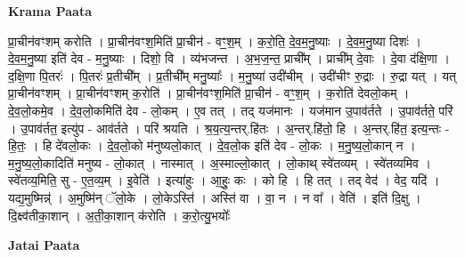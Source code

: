 \documentclass[17pt]{extarticle}
\begin{document}
\textbf{Krama Paata} \newline

प्रा॒चीन॑वꣳशम् करोति । प्रा॒चीन॑वꣳश॒मिति॑ प्रा॒चीन॑ - वꣳ॒॒श॒म् । क॒रो॒ति॒ दे॒व॒म॒नु॒ष्याः । दे॒व॒म॒नु॒ष्या दिशः॑ । दे॒व॒म॒नु॒ष्या इति॑ देव - म॒नु॒ष्याः । दिशो॒ वि । व्य॑भजन्त । अ॒भ॒ज॒न्त॒ प्राची᳚म् । प्राची᳚म् दे॒वाः । दे॒वा द॑क्षि॒णा । द॒क्षि॒णा पि॒तरः॑ । पि॒तरः॑ प्र॒तीची᳚म् । प्र॒तीची᳚म् मनु॒ष्याः᳚ । म॒नु॒ष्या॑ उदी॑चीम् । उदी॑चीꣳ रु॒द्राः । रु॒द्रा यत् । यत् प्रा॒चीन॑वꣳशम् । प्रा॒चीन॑वꣳशम् क॒रोति॑ । प्रा॒चीन॑वꣳश॒मिति॑ प्रा॒चीन॑ - वꣳ॒॒श॒म् । क॒रोति॑ देवलो॒कम् । दे॒व॒लो॒कमे॒व । दे॒व॒लो॒कमिति॑ देव - लो॒कम् । ए॒व तत् । तद् यज॑मानः । यज॑मान उ॒पाव॑र्तते । उ॒पाव॑र्तते॒ परि॑ । उ॒पाव॑र्तत॒ इत्यु॑प - आव॑र्तते । परि॑ श्रयति । श्र॒य॒त्य॒न्तर्.हि॑तः । अ॒न्तर्.हि॑तो॒ हि । अ॒न्तर्.हि॑त॒ इत्य॒न्तः - हि॒तः॒ । हि दे॑वलो॒कः । दे॒व॒लो॒को म॑नुष्यलो॒कात् । दे॒व॒लो॒क इति॑ देव - लो॒कः । म॒नु॒ष्य॒लो॒कान् न । म॒नु॒ष्य॒लो॒कादिति॑ मनुष्य - लो॒कात् । नास्मात् । अ॒स्माल्लो॒कात् । लो॒काथ् स्वे॑तव्यम् । स्वे॑तव्यमिव । स्वे॑तव्य॒मिति॒ सु - ए॒त॒व्य॒म् । इ॒वेति॑ । इत्या॑हुः । आ॒हुः॒ कः । को हि । हि तत् । तद् वेद॑ । वेद॒ यदि॑ । यद्य॒मुष्मिन्न्॑ । अ॒मुष्मि॑न् ॅलो॒के । लो॒केऽस्ति॑ । अस्ति॑ वा । वा॒ न । न वा᳚ । वेति॑ । इति॑ दि॒क्षु । दि॒क्ष्व॑तीका॒शान् । अ॒ती॒का॒शान् क॑रोति । क॒रो॒त्यु॒भयोः᳚ \newline

\textbf{Jatai Paata} \newline
\end{document}
